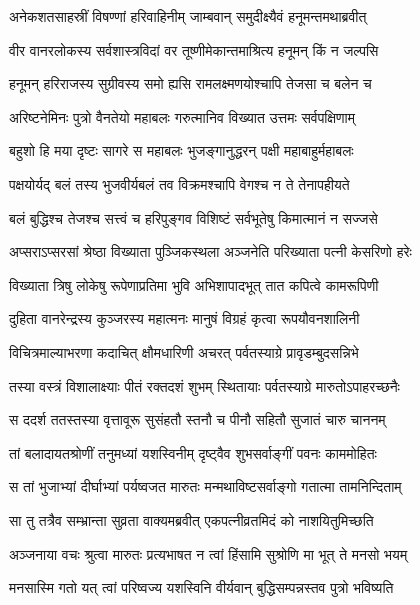
\twolineshloka
{अनेकशतसाहस्रीं विषण्णां हरिवाहिनीम्}
{जाम्बवान् समुदीक्ष्यैवं हनूमन्तमथाब्रवीत्} %

\twolineshloka
{वीर वानरलोकस्य सर्वशास्त्रविदां वर}
{तूष्णीमेकान्तमाश्रित्य हनूमन् किं न जल्पसि} %

\twolineshloka
{हनूमन् हरिराजस्य सुग्रीवस्य समो ह्यसि}
{रामलक्ष्मणयोश्चापि तेजसा च बलेन च} %

\twolineshloka
{अरिष्टनेमिनः पुत्रो वैनतेयो महाबलः}
{गरुत्मानिव विख्यात उत्तमः सर्वपक्षिणाम्} %

\twolineshloka
{बहुशो हि मया दृष्टः सागरे स महाबलः}
{भुजङ्गानुद्धरन् पक्षी महाबाहुर्महाबलः} %

\twolineshloka
{पक्षयोर्यद् बलं तस्य भुजवीर्यबलं तव}
{विक्रमश्चापि वेगश्च न ते तेनापहीयते} %

\twolineshloka
{बलं बुद्धिश्च तेजश्च सत्त्वं च हरिपुङ्गव}
{विशिष्टं सर्वभूतेषु किमात्मानं न सज्जसे} %

\twolineshloka
{अप्सराऽप्सरसां श्रेष्ठा विख्याता पुञ्जिकस्थला}
{अञ्जनेति परिख्याता पत्नी केसरिणो हरेः} %

\twolineshloka
{विख्याता त्रिषु लोकेषु रूपेणाप्रतिमा भुवि}
{अभिशापादभूत् तात कपित्वे कामरूपिणी} %

\twolineshloka
{दुहिता वानरेन्द्रस्य कुञ्जरस्य महात्मनः}
{मानुषं विग्रहं कृत्वा रूपयौवनशालिनी} %

\twolineshloka
{विचित्रमाल्याभरणा कदाचित् क्षौमधारिणी}
{अचरत् पर्वतस्याग्रे प्रावृडम्बुदसन्निभे} %

\twolineshloka
{तस्या वस्त्रं विशालाक्ष्याः पीतं रक्तदशं शुभम्}
{स्थितायाः पर्वतस्याग्रे मारुतोऽपाहरच्छनैः} %

\twolineshloka
{स ददर्श ततस्तस्या वृत्तावूरू सुसंहतौ}
{स्तनौ च पीनौ सहितौ सुजातं चारु चाननम्} %

\twolineshloka
{तां बलादायतश्रोणीं तनुमध्यां यशस्विनीम्}
{दृष्ट्वैव शुभसर्वाङ्गीं पवनः काममोहितः} %

\twolineshloka
{स तां भुजाभ्यां दीर्घाभ्यां पर्यष्वजत मारुतः}
{मन्मथाविष्टसर्वाङ्गो गतात्मा तामनिन्दिताम्} %

\twolineshloka
{सा तु तत्रैव सम्भ्रान्ता सुव्रता वाक्यमब्रवीत्}
{एकपत्नीव्रतमिदं को नाशयितुमिच्छति} %

\twolineshloka
{अञ्जनाया वचः श्रुत्वा मारुतः प्रत्यभाषत}
{न त्वां हिंसामि सुश्रोणि मा भूत् ते मनसो भयम्} %

\twolineshloka
{मनसास्मि गतो यत् त्वां परिष्वज्य यशस्विनि}
{वीर्यवान् बुद्धिसम्पन्नस्तव पुत्रो भविष्यति} %

